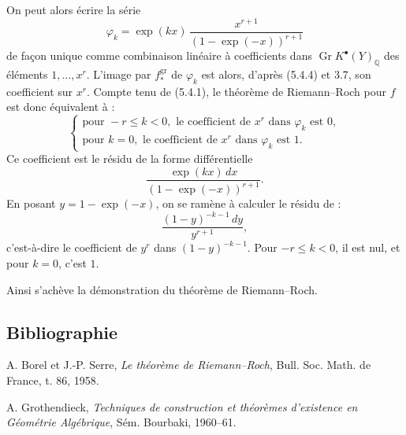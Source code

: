 \documentclass[11pt]{article}
\newcommand{\Gr}{\operatorname{Gr}}
\providecommand{\Gr}{\operatorname{Gr}}
\providecommand{\Gr}{\operatorname{G}}
\begin{document}
On peut alors écrire la série
\[
\varphi_k=\exp(kx)\,
\frac{x^{r+1}}{(1-\exp(-x))^{r+1}}
\]
de façon unique comme combinaison linéaire à coefficients dans
\(\Gr K^{\bullet}(Y)_{\mathbb Q}\) des éléments \(1,\ldots,x^r\). L'image par \(f^{\mathrm{gr}}_*\) de \(\varphi_k\) est alors, d'après (5.4.4) et 3.7, son coefficient sur \(x^r\). Compte tenu de (5.4.1), le théorème de Riemann--Roch pour \(f\) est donc équivalent à :
\[
\left\{
\begin{array}{ll}
\text{pour }-r\leq k<0,\text{ le coefficient de }x^r\text{ dans }\varphi_k\text{ est }0,\\
\text{pour }k=0,\text{ le coefficient de }x^r\text{ dans }\varphi_k\text{ est }1.
\end{array}
\right.
\tag{RR}
\]
Ce coefficient est le résidu de la forme différentielle
\[
 \frac{\exp(kx)\,dx}{(1-\exp(-x))^{r+1}}.
\]
En posant \(y=1-\exp(-x)\), on se ramène à calculer le résidu de :
\[
 \frac{(1-y)^{-k-1}\,dy}{y^{r+1}},
\]
c'est-à-dire le coefficient de \(y^r\) dans \((1-y)^{-k-1}\). Pour \(-r\leq k<0\), il est nul, et pour \(k=0\), c'est \(1\).

Ainsi s'achève la démonstration du théorème de Riemann--Roch.

\subsection*{Bibliographie}
\begin{enumerate}[label={[\arabic*]}]
\item A. Borel et J.-P. Serre, \emph{Le théorème de Riemann--Roch}, Bull. Soc. Math. de France, t. 86, 1958.
\item A. Grothendieck, \emph{Techniques de construction et théorèmes d'existence en Géométrie Algébrique}, Sém. Bourbaki, 1960--61.
\end{enumerate}
\end{document}
